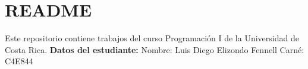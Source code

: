 \chapter{README}
\hypertarget{md__r_e_a_d_m_e}{}\label{md__r_e_a_d_m_e}
Este repositorio contiene trabajos del curso Programación I de la Universidad de Costa Rica. {\bfseries{Datos del estudiante\+:}} Nombre\+: Luis Diego Elizondo Fennell Carné\+: C4\+E844 
